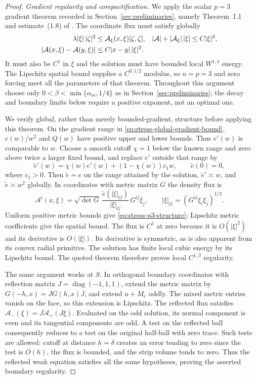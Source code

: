 \begin{proof}
\emph{Gradient regularity and compactification.}
We apply the scalar $p=3$ gradient theorem recorded in
Section~\ref{sec:preliminaries}, namely Theorem~1.1 and estimate~(1.8)
of \citet{AraujoZhang2020}.  The coordinate flux must satisfy globally
\begin{align}
 \lambda|\xi|\,|\zeta|^2
 &\le \mathcal A_\xi(x,\xi)[\zeta,\zeta],
 &|\mathcal A|+|\mathcal A_\xi|\,|\xi|&\le C|\xi|^2,
 \label{eq:stress-p3-structure}\\
 |\mathcal A(x,\xi)-\mathcal A(y,\xi)|
 &\le C|x-y|\,|\xi|^2.
 \notag
\end{align}
It must also be $C^1$ in $\xi$ and the solution must have bounded
local $W^{1,3}$ energy.  The Lipschitz spatial bound supplies a
$C^{0,1/2}$ modulus, so $n=p=3$ and zero forcing meet all the
parameters of that theorem.  Throughout this argument choose only
$0<\beta<\min\{\alpha_m,1/4\}$ as in
Section~\ref{sec:preliminaries}; the decay and boundary limits below
require a positive exponent, not an optimal one.

We verify global, rather than merely bounded-gradient, structure before
applying this theorem.  On the gradient range in
\eqref{eq:stress-global-gradient-bound}, $e(w)/w^2$ and $Q(w)$ have
positive upper and lower bounds.  Thus $e'(w)$ is comparable to $w$.
Choose a smooth cutoff $\chi=1$ below the known range and zero above
twice a larger fixed bound, and replace $e'$ outside that range by
\[
 \widetilde e'(w)=\chi(w)e'(w)+(1-\chi(w))c_1w,
 \qquad \widetilde e(0)=0,
\]
where $c_1>0$.  Then $\widetilde e=e$ on the range attained by the
solution, $\widetilde e'\asymp w$, and $\widetilde e\asymp w^2$
globally.  In coordinates with metric matrix $G$ the density flux is
\begin{equation}
 \mathcal A^i(x,\xi)=\sqrt{\det G}\,
 \frac{\widetilde e(|\xi|_G)}{|\xi|_G}\,G^{ij}\xi_j,
 \qquad |\xi|_G=(G^{ij}\xi_i\xi_j)^{1/2}.
 \label{eq:stress-coordinate-flux}
\end{equation}
Uniform positive metric bounds give
\eqref{eq:stress-p3-structure}; Lipschitz metric coefficients give
the spatial bound.  The flux is $C^1$ at zero because it is
$O(|\xi|^2)$ and its derivative is $O(|\xi|)$.  Its derivative is
symmetric, as is also apparent from its convex radial primitive.
The solution has finite local cubic energy by its Lipschitz bound.
The quoted theorem therefore proves local $C^{1,\beta}$ regularity.

The same argument works at $S$.  In orthogonal boundary coordinates
with reflection matrix $J=\operatorname{diag}(-1,1,1)$, extend the
metric matrix by $G(-h,x)=JG(h,x)J$, and extend $u+M_e$ oddly.
The mixed metric entries vanish on the face, so this extension is
Lipschitz.  The reflected flux satisfies
$\mathcal A_-(\xi)=J\mathcal A_+(J\xi)$.  Evaluated on the odd
solution, its normal component is even and its tangential components
are odd.  A test on the reflected ball consequently reduces to a
test on the original half-ball with zero trace.  Such tests are
allowed: cutoff at distance $h=\delta$ creates an error tending to
zero since the test is $O(h)$, the flux is bounded, and the strip
volume tends to zero.  Thus the reflected weak equation satisfies
all the same hypotheses, proving the asserted boundary regularity.


\end{proof}
